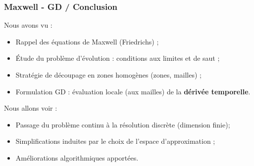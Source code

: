 \begin{frame}
\frametitle{Maxwell - GD / Conclusion}
\vfill
Nous avons vu :
\begin{itemize}
\item Rappel des équations de Maxwell (Friedrichs) ;
\item Étude du problème d'évolution : conditions aux limites et de saut ;
\item Stratégie de découpage en zones homogènes (zones, mailles) ;
\item Formulation GD : évaluation locale (aux mailles) de la \textbf{dérivée temporelle}.
\end{itemize}
\vfill
\pause
Nous allons voir :
\begin{itemize}
\item Passage du problème continu à la résolution discrète (dimension finie);
\item Simplifications induites par le choix de l'espace d'approximation ;
\item Améliorations algorithmiques apportées.
\end{itemize}
\vfill
\end{frame}

